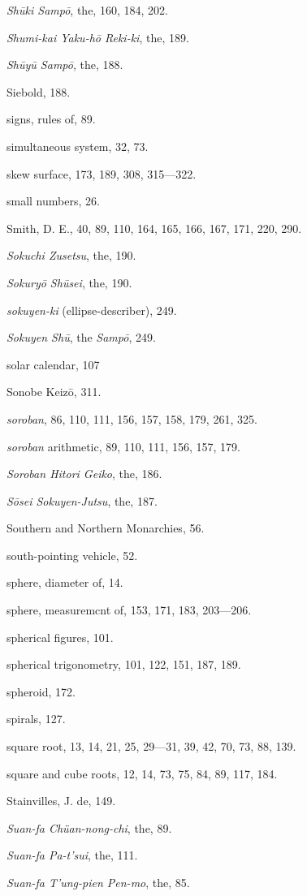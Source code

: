 \documentclass[11pt]{article}
\begin{document}
\emph{Shūki Sampō}, the, 160, 184, 202.\par
\emph{Shumi-kai Yaku-hō Reki-ki}, the, 189.\par
\emph{Shūyū Sampō}, the, 188.\par
Siebold, 188.\par
signs, rules of, 89.\par
simultaneous system, 32, 73.\par
skew surface, 173, 189, 308, 315---322.\par
small numbers, 26.\par
Smith, D. E., 40, 89, 110, 164, 165, 166, 167, 171, 220, 290.\par
\emph{Sokuchi Zusetsu}, the, 190.\par
\emph{Sokuryō Shūsei}, the, 190.\par
\emph{sokuyen-ki} (ellipse-describer), 249.\par
\emph{Sokuyen Shū}, the \emph{Sampō}, 249.\par
solar calendar, 107\par
Sonobe Keizō, 311.\par
\emph{soroban}, 86, 110, 111, 156, 157, 158, 179, 261, 325.\par
\emph{soroban} arithmetic, 89, 110, 111, 156, 157, 179.\par
\emph{Soroban Hitori Geiko}, the, 186.\par
\emph{Sōsei Sokuyen-Jutsu}, the, 187.\par
Southern and Northern Monarchies, 56.\par
south-pointing vehicle, 52.\par
sphere, diameter of, 14.\par
sphere, measuremcnt of, 153, 171, 183, 203---206.\par
spherical figures, 101.\par
spherical trigonometry, 101, 122, 151, 187, 189.\par
spheroid, 172.\par
spirals, 127.\par
square root, 13, 14, 21, 25, 29---31, 39, 42, 70, 73, 88, 139.\par
square and cube roots, 12, 14, 73, 75, 84, 89, 117, 184.\par
Stainvilles, J. de, 149.\par
\emph{Suan-fa Chüan-nong-chi}, the, 89.\par
\emph{Suan-fa Pa-t'sui}, the, 111.\par
\emph{Suan-fa T'ung-pien Pen-mo}, the, 85.\par
\end{document}
